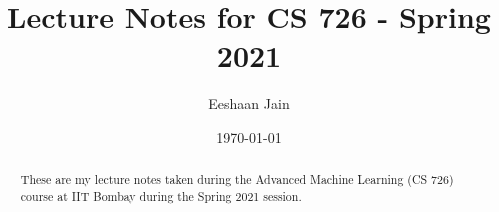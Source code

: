 \documentclass{tufte-handout}
\title{Lecture Notes for CS 726 - Spring 2021}
\author[Eeshaan Jain]{Eeshaan Jain}
\date{\today}  %
\theoremstyle{definition}
\theoremstyle{remark}
\begin{document}
	
	\maketitle
	\begin{abstract}
		These are my lecture notes taken during the Advanced Machine Learning (CS 726) course at IIT Bombay during the Spring 2021 session.	\end{abstract}
	\tableofcontents
	\newpage
	
	
\end{document}
